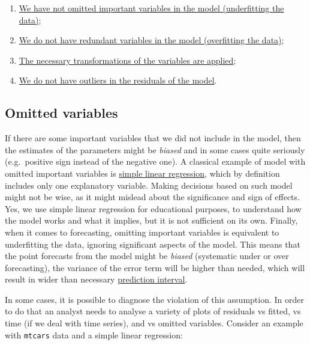\documentclass[
]{book}
\providecommand{\tightlist}{%
  \setlength{\itemsep}{0pt}\setlength{\parskip}{0pt}}
\theoremstyle{definition}
\theoremstyle{definition}
\theoremstyle{definition}
\theoremstyle{definition}
\theoremstyle{remark}
\begin{document}
\begin{enumerate}
\def\labelenumi{\arabic{enumi}.}
\tightlist
\item
  \hyperref[assumptionsCorrectModelOmitted]{We have not omitted important variables in the model (underfitting the data)};
\item
  \hyperref[assumptionsCorrectModelRedundant]{We do not have redundant variables in the model (overfitting the data)};
\item
  \hyperref[assumptionsCorrectModelTransformations]{The necessary transformations of the variables are applied};
\item
  \hyperref[assumptionsCorrectModelOutliers]{We do not have outliers in the residuals of the model}.
\end{enumerate}

\subsection{Omitted variables}\label{assumptionsCorrectModelOmitted}

If there are some important variables that we did not include in the model, then the estimates of the parameters might be \emph{biased} and in some cases quite seriously (e.g.~positive sign instead of the negative one). A classical example of model with omitted important variables is \hyperref[simpleLinearRegression]{simple linear regression}, which by definition includes only one explanatory variable. Making decisions based on such model might not be wise, as it might mislead about the significance and sign of effects. Yes, we use simple linear regression for educational purposes, to understand how the model works and what it implies, but it is not sufficient on its own. Finally, when it comes to forecasting, omitting important variables is equivalent to underfitting the data, ignoring significant aspects of the model. This means that the point forecasts from the model might be \emph{biased} (systematic under or over forecasting), the variance of the error term will be higher than needed, which will result in wider than necessary \hyperref[confidenceIntervalsPrediction]{prediction interval}.

In some cases, it is possible to diagnose the violation of this assumption. In order to do that an analyst needs to analyse a variety of plots of residuals vs fitted, vs time (if we deal with time series), and vs omitted variables. Consider an example with \texttt{mtcars} data and a simple linear regression:
\end{document}

